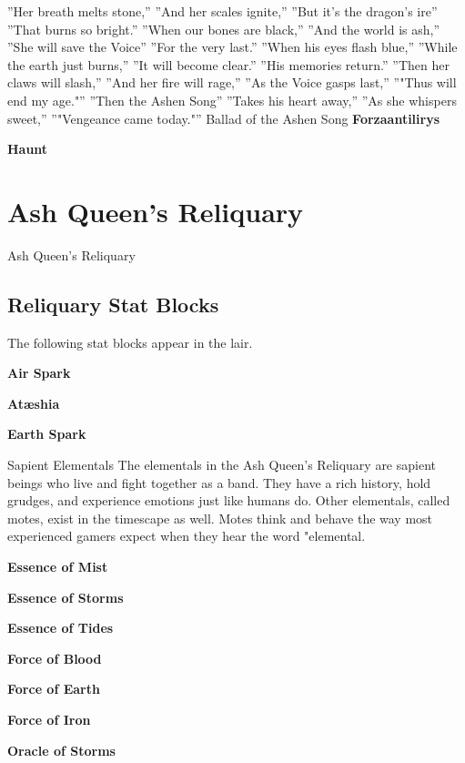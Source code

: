 \documentclass[10pt,a4paper,twoside,bg=print,twocolumn,openany,nodeprecatedcode]{dndbook}
\begin{document}
\DndQuote%
{}
{''Her breath melts stone,''}
{''And her scales ignite,''}
{''But it's the dragon's ire''}
{''That burns so bright.''}
{''When our bones are black,''}
{''And the world is ash,''}
{''She will save the Voice''}
{''For the very last.''}
{''When his eyes flash blue,''}
{''While the earth just burns,''}
{''It will become clear.''}
{''His memories return.''}
{''Then her claws will slash,''}
{''And her fire will rage,''}
{''As the Voice gasps last,''}
{''"Thus will end my age."''}
{''Then the Ashen Song''}
{''Takes his heart away,''}
{''As she whispers sweet,''}
{''"Vengeance came today."''}
{Ballad of the Ashen Song}
\textbf{Forzaantilirys}

\textbf{Haunt}

\chapter{Ash Queen's Reliquary}
Ash Queen's Reliquary

\section{Reliquary Stat Blocks}
The following stat blocks appear in the lair.

\textbf{Air Spark}

\textbf{Atæshia}

\textbf{Earth Spark}

\begin{DndSidebar}[float=!b]{Sapient Elementals}
The elementals in the Ash Queen's Reliquary are sapient beings who live and fight together as a band. They have a rich history, hold grudges, and experience emotions just like humans do. Other elementals, called motes, exist in the timescape as well. Motes think and behave the way most experienced gamers expect when they hear the word "elemental.



\end{DndSidebar}

\textbf{Essence of Mist}

\textbf{Essence of Storms}

\textbf{Essence of Tides}

\textbf{Force of Blood}

\textbf{Force of Earth}

\textbf{Force of Iron}

\textbf{Oracle of Storms}
\end{document}
